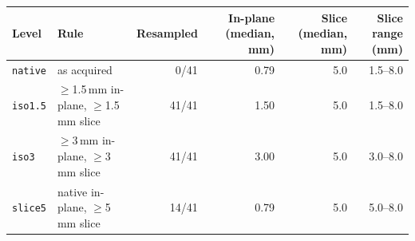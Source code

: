 \begin{tabular}{llrrrr}
\toprule
Level & Rule & Resampled & In-plane (median, mm) & Slice (median, mm) & Slice range (mm) \\
\midrule
\texttt{native} & as acquired & 0/41 & 0.79 & 5.0 & 1.5--8.0 \\
\texttt{iso1.5} & $\geq$1.5\,mm in-plane, $\geq$1.5\,mm slice & 41/41 & 1.50 & 5.0 & 1.5--8.0 \\
\texttt{iso3} & $\geq$3\,mm in-plane, $\geq$3\,mm slice & 41/41 & 3.00 & 5.0 & 3.0--8.0 \\
\texttt{slice5} & native in-plane, $\geq$5\,mm slice & 14/41 & 0.79 & 5.0 & 5.0--8.0 \\
\bottomrule
\end{tabular}
